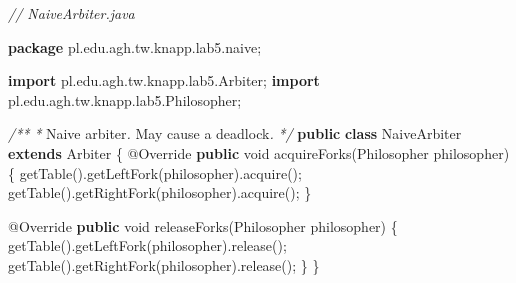 \documentclass[11pt]{article}
\newenvironment{Shaded}{}{}
\newcommand{\KeywordTok}[1]{\textcolor[rgb]{0.00,0.44,0.13}{\textbf{{#1}}}}
\newcommand{\DataTypeTok}[1]{\textcolor[rgb]{0.56,0.13,0.00}{{#1}}}
\newcommand{\CommentTok}[1]{\textcolor[rgb]{0.38,0.63,0.69}{\textit{{#1}}}}
\newcommand{\FunctionTok}[1]{\textcolor[rgb]{0.02,0.16,0.49}{{#1}}}
\newcommand{\NormalTok}[1]{{#1}}
\newcommand{\ImportTok}[1]{{#1}}
\newcommand{\OperatorTok}[1]{\textcolor[rgb]{0.40,0.40,0.40}{{#1}}}
\newcommand{\AttributeTok}[1]{\textcolor[rgb]{0.49,0.56,0.16}{{#1}}}
\begin{document}
\begin{Shaded}
\begin{Highlighting}[]
\CommentTok{// NaiveArbiter.java}

\KeywordTok{package}\ImportTok{ pl}\OperatorTok{.}\ImportTok{edu}\OperatorTok{.}\ImportTok{agh}\OperatorTok{.}\ImportTok{tw}\OperatorTok{.}\ImportTok{knapp}\OperatorTok{.}\ImportTok{lab5}\OperatorTok{.}\ImportTok{naive}\OperatorTok{;}

\KeywordTok{import} \ImportTok{pl}\OperatorTok{.}\ImportTok{edu}\OperatorTok{.}\ImportTok{agh}\OperatorTok{.}\ImportTok{tw}\OperatorTok{.}\ImportTok{knapp}\OperatorTok{.}\ImportTok{lab5}\OperatorTok{.}\ImportTok{Arbiter}\OperatorTok{;}
\KeywordTok{import} \ImportTok{pl}\OperatorTok{.}\ImportTok{edu}\OperatorTok{.}\ImportTok{agh}\OperatorTok{.}\ImportTok{tw}\OperatorTok{.}\ImportTok{knapp}\OperatorTok{.}\ImportTok{lab5}\OperatorTok{.}\ImportTok{Philosopher}\OperatorTok{;}

\CommentTok{/**}
 \CommentTok{*}\NormalTok{ Naive arbiter}\CommentTok{. }\NormalTok{May cause a deadlock}\CommentTok{.}
 \CommentTok{*/}
\KeywordTok{public} \KeywordTok{class}\NormalTok{ NaiveArbiter }\KeywordTok{extends}\NormalTok{ Arbiter }\OperatorTok{\{}
    \AttributeTok{@Override}
    \KeywordTok{public} \DataTypeTok{void} \FunctionTok{acquireForks}\OperatorTok{(}\NormalTok{Philosopher philosopher}\OperatorTok{)} \OperatorTok{\{}
        \FunctionTok{getTable}\OperatorTok{().}\FunctionTok{getLeftFork}\OperatorTok{(}\NormalTok{philosopher}\OperatorTok{).}\FunctionTok{acquire}\OperatorTok{();}
        \FunctionTok{getTable}\OperatorTok{().}\FunctionTok{getRightFork}\OperatorTok{(}\NormalTok{philosopher}\OperatorTok{).}\FunctionTok{acquire}\OperatorTok{();}
    \OperatorTok{\}}

    \AttributeTok{@Override}
    \KeywordTok{public} \DataTypeTok{void} \FunctionTok{releaseForks}\OperatorTok{(}\NormalTok{Philosopher philosopher}\OperatorTok{)} \OperatorTok{\{}
        \FunctionTok{getTable}\OperatorTok{().}\FunctionTok{getLeftFork}\OperatorTok{(}\NormalTok{philosopher}\OperatorTok{).}\FunctionTok{release}\OperatorTok{();}
        \FunctionTok{getTable}\OperatorTok{().}\FunctionTok{getRightFork}\OperatorTok{(}\NormalTok{philosopher}\OperatorTok{).}\FunctionTok{release}\OperatorTok{();}
    \OperatorTok{\}}
\OperatorTok{\}}
\end{Highlighting}
\end{Shaded}
\end{document}
